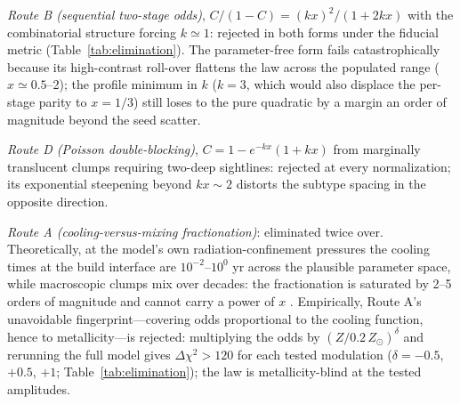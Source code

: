 \documentclass[twocolumn]{aastex631}
\begin{document}
\emph{Route B (sequential two-stage odds)}, $C/(1-C)=(kx)^{2}/(1+2kx)$
with the combinatorial structure forcing $k\simeq1$: rejected in both
forms under the fiducial metric (Table~\ref{tab:elimination}). The
parameter-free form fails catastrophically because its high-contrast
roll-over flattens the law across the populated range
($x\simeq0.5$--2); the profile minimum in $k$ ($k=3$, which would also
displace the per-stage parity to $x=1/3$) still loses to the pure
quadratic by a margin an order of magnitude beyond the seed scatter.

\emph{Route D (Poisson double-blocking)}, $C=1-e^{-kx}(1+kx)$ from
marginally translucent clumps requiring two-deep sightlines: rejected at
every normalization; its exponential steepening beyond $kx\sim2$ distorts
the subtype spacing in the opposite direction.

\emph{Route A (cooling-versus-mixing fractionation)}: eliminated twice
over. Theoretically, at the model's own radiation-confinement pressures
the cooling times at the build interface are $10^{-2}$--$10^{0}$ yr
across the plausible parameter space, while macroscopic clumps mix over
decades: the fractionation is saturated by 2--5 orders of magnitude and
cannot carry a power of $x$
\citep[cf.\ cloud-crushing and survival scalings;][]{Klein1994,GronkeOh2018}.
Empirically, Route A's unavoidable fingerprint---covering odds
proportional to the cooling function, hence to metallicity---is rejected:
multiplying the odds by $(Z/0.2\,Z_{\odot})^{\delta}$ and rerunning the
full model gives $\Delta\chi^{2}>120$ for each tested modulation
($\delta=-0.5$, $+0.5$, $+1$; Table~\ref{tab:elimination}); the law is
metallicity-blind at the tested amplitudes.
\end{document}
